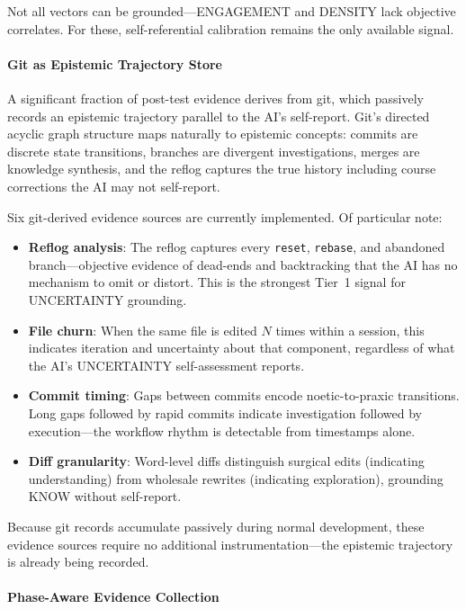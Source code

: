 Not all vectors can be grounded---ENGAGEMENT and DENSITY lack objective correlates. For these, self-referential calibration remains the only available signal.

\paragraph{Git as Epistemic Trajectory Store}

A significant fraction of post-test evidence derives from git, which passively records an epistemic trajectory parallel to the AI's self-report. Git's directed acyclic graph structure maps naturally to epistemic concepts: commits are discrete state transitions, branches are divergent investigations, merges are knowledge synthesis, and the reflog captures the true history including course corrections the AI may not self-report.

Six git-derived evidence sources are currently implemented. Of particular note:

\begin{itemize}
    \item \textbf{Reflog analysis}: The reflog captures every \texttt{reset}, \texttt{rebase}, and abandoned branch---objective evidence of dead-ends and backtracking that the AI has no mechanism to omit or distort. This is the strongest Tier~1 signal for UNCERTAINTY grounding.
    \item \textbf{File churn}: When the same file is edited $N$ times within a session, this indicates iteration and uncertainty about that component, regardless of what the AI's UNCERTAINTY self-assessment reports.
    \item \textbf{Commit timing}: Gaps between commits encode noetic-to-praxic transitions. Long gaps followed by rapid commits indicate investigation followed by execution---the workflow rhythm is detectable from timestamps alone.
    \item \textbf{Diff granularity}: Word-level diffs distinguish surgical edits (indicating understanding) from wholesale rewrites (indicating exploration), grounding KNOW without self-report.
\end{itemize}

Because git records accumulate passively during normal development, these evidence sources require no additional instrumentation---the epistemic trajectory is already being recorded.

\paragraph{Phase-Aware Evidence Collection}

